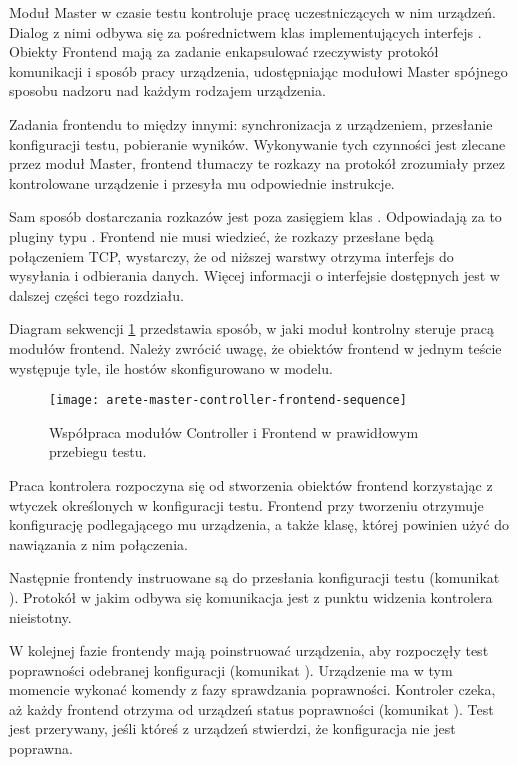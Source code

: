 \documentclass[00-praca-magisterska.tex]{subfiles}
\begin{document}
Moduł Master w czasie testu kontroluje pracę uczestniczących w nim urządzeń.
Dialog z nimi odbywa się za pośrednictwem klas implementujących interfejs
. Obiekty Frontend mają za zadanie enkapsulować rzeczywisty
protokół komunikacji i sposób pracy urządzenia, udostępniając modułowi Master
spójnego sposobu nadzoru nad każdym rodzajem urządzenia.

Zadania frontendu to między innymi: synchronizacja z urządzeniem, przesłanie
konfiguracji testu, pobieranie wyników. Wykonywanie tych czynności jest zlecane
przez moduł Master, frontend tłumaczy te rozkazy na protokół zrozumiały przez
kontrolowane urządzenie i przesyła mu odpowiednie instrukcje.

Sam sposób dostarczania rozkazów jest poza zasięgiem klas .
Odpowiadają za to pluginy typu . Frontend nie musi
wiedzieć, że rozkazy przesłane będą połączeniem TCP, wystarczy, że od niższej
warstwy otrzyma interfejs do wysyłania i odbierania danych. Więcej informacji o
interfejsie  dostępnych jest w dalszej części tego
rozdziału.

Diagram sekwencji \ref{fig:arete-master-controller-frontend-sequence}
przedstawia sposób, w jaki moduł kontrolny steruje pracą modułów frontend.
Należy zwrócić uwagę, że obiektów frontend w jednym teście występuje tyle, ile
hostów skonfigurowano w modelu.

\begin{figure}[htb]
\begin{center}
\leavevmode
\texttt{[image: arete-master-controller-frontend-sequence]}
\end{center}
\caption{Współpraca modułów Controller i Frontend w prawidłowym przebiegu testu.}
\label{fig:arete-master-controller-frontend-sequence}
\end{figure}

Praca kontrolera rozpoczyna się od stworzenia obiektów frontend korzystając z
wtyczek określonych w konfiguracji testu. Frontend przy tworzeniu otrzymuje
konfigurację podlegającego mu urządzenia, a także klasę, której powinien użyć
do nawiązania z nim połączenia.

Następnie frontendy instruowane są do przesłania konfiguracji testu (komunikat
). Protokół w jakim odbywa się komunikacja jest z
punktu widzenia kontrolera nieistotny.

W kolejnej fazie frontendy mają poinstruować urządzenia, aby rozpoczęły test
poprawności odebranej konfiguracji (komunikat ).
Urządzenie ma w tym momencie wykonać komendy z fazy sprawdzania poprawności.
Kontroler czeka, aż każdy frontend otrzyma od urządzeń status poprawności
(komunikat ). Test jest przerywany, jeśli któreś z
urządzeń stwierdzi, że konfiguracja nie jest poprawna.
\end{document}
